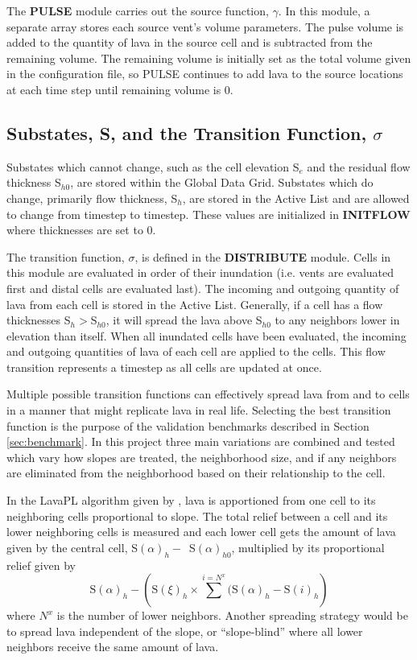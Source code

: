 \documentclass[12pt,letter]{article}
\begin{document}
		The \textbf{PULSE} module carries out the source function, $\gamma$. In this module, a separate array stores each source vent's volume parameters. The pulse volume is added to the quantity of lava in the source cell and is subtracted from the remaining volume. The remaining volume is initially set as the total volume given in the configuration file, so PULSE continues to add lava to the source locations at each time step until remaining volume is 0.
		
	\subsection{Substates, S, and the Transition Function, $\sigma$}
		Substates which cannot change, such as the cell elevation S$_e$ and the residual flow thickness S$_{h0}$, are stored within the Global Data Grid. Substates which do change, primarily flow thickness, S$_h$, are stored in the Active List and are allowed to change from timestep to timestep. These values are initialized in \textbf{INITFLOW} where thicknesses are set to 0.
		
		The transition function, $\sigma$, is defined in the \textbf{DISTRIBUTE} module. Cells in this module are evaluated in order of their inundation (i.e. vents are evaluated first and distal cells are evaluated last). The incoming and outgoing quantity of lava from each cell is stored in the Active List. Generally, if a cell has a flow thicknesses S$_h>$S$_{h0}$, it will spread the lava above S$_{h0}$ to any neighbors lower in elevation than itself. When all inundated cells have been evaluated, the incoming and outgoing quantities of lava of each cell are applied to the cells. This flow transition represents a timestep as all cells are updated at once.
		
		Multiple possible transition functions can effectively spread lava from and to cells in a manner that might replicate lava in real life. Selecting the best transition function is the purpose of the validation benchmarks described in Section \ref{sec:benchmark}. In this project three main variations are combined and tested which vary how slopes are treated, the neighborhood size, and if any neighbors are eliminated from the neighborhood based on their relationship to the cell.
			
		In the LavaPL algorithm given by \citet{connor2012}, lava is apportioned from one cell to its neighboring cells proportional to slope. The total relief between a cell and its lower neighboring cells is measured and each lower cell gets the amount of lava given by the central cell, S$(\alpha)_h-$~S$(\alpha)_{h0}$, multiplied by its proportional relief given by 
		\begin{equation}
			\mathrm{S}(\alpha)_h-\left(\mathrm{S}(\xi)_h\times\sum^{i=N^x}(\mathrm{S}(\alpha)_h-\mathrm{S}(i)_h\right)
		\end{equation}
		where $N^x$ is the number of lower neighbors. Another spreading strategy would be to spread lava independent of the slope, or ``slope-blind'' where all lower neighbors receive the same amount of lava.
		
\end{document}

